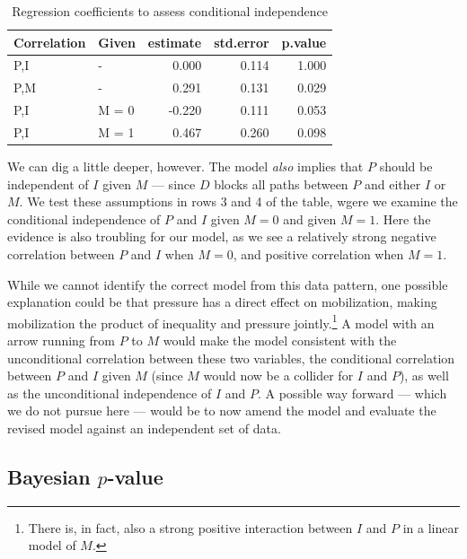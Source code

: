 \documentclass[
  12pt,
]{book}
\begin{document}
\begin{table}

\caption{\label{tab:ch15cipimd}Regression coefficients to assess conditional independence}
\centering
\begin{tabular}[t]{l|l|r|r|r}
\hline
Correlation & Given & estimate & std.error & p.value\\
\hline
P,I & - & 0.000 & 0.114 & 1.000\\
\hline
P,M & - & 0.291 & 0.131 & 0.029\\
\hline
P,I & M = 0 & -0.220 & 0.111 & 0.053\\
\hline
P,I & M = 1 & 0.467 & 0.260 & 0.098\\
\hline
\end{tabular}
\end{table}

We can dig a little deeper, however. The model \emph{also} implies that \(P\) should be independent of \(I\) given \(M\) --- since \(D\) blocks all paths between \(P\) and either \(I\) or \(M\). We test these assumptions in rows 3 and 4 of the table, wgere we examine the conditional independence of \(P\) and \(I\) given \(M=0\) and given \(M=1\). Here the evidence is also troubling for our model, as we see a relatively strong negative correlation between \(P\) and \(I\) when \(M=0\), and positive correlation when \(M=1\).

While we cannot identify the correct model from this data pattern, one possible explanation could be that pressure has a direct effect on mobilization, making mobilization the product of inequality and pressure jointly.\footnote{There is, in fact, also a strong positive interaction between \(I\) and \(P\) in a linear model of \(M\).} A model with an arrow running from \(P\) to \(M\) would make the model consistent with the unconditional correlation between these two variables, the conditional correlation between \(P\) and \(I\) given \(M\) (since \(M\) would now be a collider for \(I\) and \(P\)), as well as the unconditional independence of \(I\) and \(P\). A possible way forward --- which we do not pursue here --- would be to now amend the model and evaluate the revised model against an independent set of data.

\hypertarget{bayesian-p-value}{%
\subsection{\texorpdfstring{Bayesian \(p\)-value}{Bayesian p-value}}\label{bayesian-p-value}}
\end{document}
